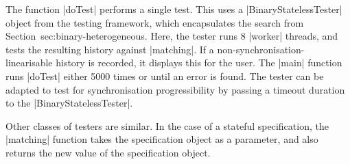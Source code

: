 The function |doTest| performs a single test.  This uses a
|BinaryStatelessTester| object from the testing framework, which encapsulates
the search from Section~{sec:binary-heterogeneous}.  Here, the tester runs 8
|worker| threads, and tests the resulting history against |matching|.  If a
non-synchronisation-linearisable history is recorded, it displays this for the
user.  The |main| function runs |doTest| either 5000 times or until an error
is found.  The tester can be adapted to test for synchronisation
progressibility by passing a timeout duration to the |BinaryStatelessTester|.

Other classes of testers are similar.  In the case of a stateful
specification, the |matching| function takes the specification object as a
parameter, and also returns the new value of the specification object.

